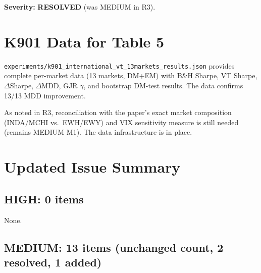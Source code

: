 \documentclass[12pt,a4paper]{article}
\begin{document}
\textbf{Severity:} \textcolor{okgreen}{\textbf{RESOLVED} (was MEDIUM in R3).}


\section{K901 Data for Table 5}

\texttt{experiments/k901\_international\_vt\_13markets\_results.json} provides complete per-market data (13 markets, DM+EM) with B\&H Sharpe, VT Sharpe, $\Delta$Sharpe, $\Delta$MDD, GJR $\gamma$, and bootstrap DM-test results. The data confirms 13/13 MDD improvement.

As noted in R3, reconciliation with the paper's exact market composition (INDA/MCHI vs.\ EWH/EWY) and VIX sensitivity measure is still needed (remains MEDIUM M1). The data infrastructure is in place.


\section{Updated Issue Summary}

\subsection*{\textcolor{highsev}{HIGH: 0 items}}

None.

\subsection*{\textcolor{medsev}{MEDIUM: 13 items (unchanged count, 2 resolved, 1 added)}}
\end{document}
